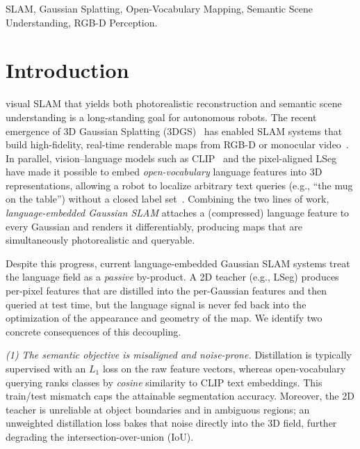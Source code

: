 \documentclass[10pt, journal]{IEEEtran}
\begin{document}
\begin{IEEEkeywords}
SLAM, Gaussian Splatting, Open-Vocabulary Mapping, Semantic Scene Understanding, RGB-D Perception.
\end{IEEEkeywords}

\section{Introduction}\label{sec:intro}
 visual SLAM that yields both photorealistic reconstruction
and semantic scene understanding is a long-standing goal for autonomous robots.
The recent emergence of 3D Gaussian Splatting (3DGS)~\cite{kerbl3Dgaussians} has
enabled SLAM systems that build high-fidelity, real-time renderable maps from
RGB-D or monocular video~\cite{keetha2024splatam,matsuki2024monogs,yan2024gsslam,yugay2023gaussianslam}.
In parallel, vision--language models such as CLIP~\cite{radford2021clip} and the
pixel-aligned LSeg~\cite{li2022lseg} have made it possible to embed
\emph{open-vocabulary} language features into 3D representations, allowing a robot
to localize arbitrary text queries (e.g., ``the mug on the table'') without a
closed label set~\cite{kerr2023lerf,qin2024langsplat,zhou2024feature3dgs}.
Combining the two lines of work, \emph{language-embedded Gaussian SLAM} attaches a
(compressed) language feature to every Gaussian and renders it differentiably,
producing maps that are simultaneously photorealistic and queryable.

Despite this progress, current language-embedded Gaussian SLAM systems treat the
language field as a \emph{passive} by-product. A 2D teacher (e.g., LSeg) produces
per-pixel features that are distilled into the per-Gaussian features and then
queried at test time, but the language signal is never fed back into the
optimization of the appearance and geometry of the map. We identify two concrete
consequences of this decoupling.

\textit{(1) The semantic objective is misaligned and noise-prone.} Distillation is
typically supervised with an $L_1$ loss on the raw feature vectors, whereas
open-vocabulary querying ranks classes by \emph{cosine} similarity to CLIP text
embeddings. This train/test mismatch caps the attainable segmentation accuracy.
Moreover, the 2D teacher is unreliable at object boundaries and in ambiguous
regions; an unweighted distillation loss bakes that noise directly into the 3D
field, further degrading the intersection-over-union (IoU).
\end{document}
